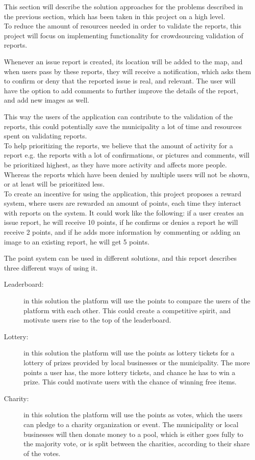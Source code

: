 
This section will describe the solution approaches for the problems described in the previous section, which has been taken in this project on a high level.
~\\

To reduce the amount of resources needed in order to validate the reports, this project will focus on implementing functionality for crowdsourcing validation of reports.

Whenever an issue report is created, its location will be added to the map, and when users pass by these reports, they will receive a notification, which asks them to confirm or deny that the reported issue is real, and relevant. The user will have the option to add comments to further improve the details of the report, and add new images as well. 

This way the users of the application can contribute to the validation of the reports, this could potentially save the municipality a lot of time and resources spent on validating reports.
~\\

To help prioritizing the reports, we believe that the amount of activity for a report e.g. the reports with a lot of confirmations, or pictures and comments, will be prioritized highest, as they have more activity and affects more people. Whereas the reports which have been denied by multiple users will not be shown, or at least will be prioritized less.
~\\

To create an incentive for using the application, this project proposes a reward system, where users are rewarded an amount of points, each time they interact with reports on the system. It could work like the following: if a user creates an issue report, he will receive 10 points, if he confirms or denies a report he will receive 2 points, and if he adds more information by commenting or adding an image to an existing report, he will get 5 points.

The point system can be used in different solutions, and this report describes three different ways of using it.
\begin{description}
\item [Leaderboard:] in this solution the platform will use the points to compare the users of the platform with each other. This could create a competitive spirit, and motivate users rise to the top of the leaderboard.
\item [Lottery:] in this solution the platform will use the points as lottery tickets for a lottery of prizes provided by local businesses or the municipality. The more points a user has, the more lottery tickets, and chance he has to win a prize. This could motivate users with the chance of winning free items.
\item [Charity:] in this solution the platform will use the points as votes, which the users can pledge to a charity organization or event. The municipality or local businesses will then donate money to a pool, which is either goes fully to the majority vote, or is split between the charities, according to their share of the votes.
\end{description}


